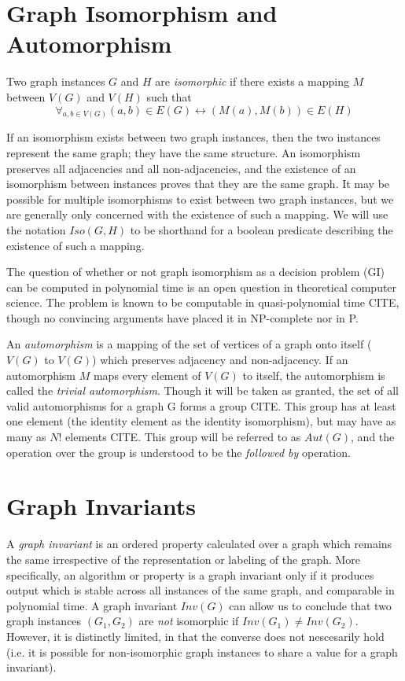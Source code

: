 \section{Graph Isomorphism and Automorphism}

Two graph instances $G$ and $H$ are \emph{isomorphic} if there exists a mapping $M$ between $V(G)$ and $V(H)$ such that $$\forall_{a, b \in V(G)} (a, b) \in E(G) \leftrightarrow (M(a), M(b)) \in E(H)$$

If an isomorphism exists between two graph instances, then the two instances represent the same graph; they have the same structure.
An isomorphism preserves all adjacencies and all non-adjacencies, and the existence of an isomorphism between instances proves that they are the same graph.
It may be possible for multiple isomorphisms to exist between two graph instances, but we are generally only concerned with the existence of such a mapping.
We will use the notation $Iso(G, H)$ to be shorthand for a boolean predicate describing the existence of such a mapping.

The question of whether or not graph isomorphism as a decision problem (GI) can be computed in polynomial time is an open question in theoretical computer science.
The problem is known to be computable in quasi-polynomial time CITE, though no convincing arguments have placed it in NP-complete nor in P.

An \emph{automorphism} is a mapping of the set of vertices of a graph onto itself ($V(G)$ to $V(G)$) which preserves adjacency and non-adjacency.
If an automorphism $M$ maps every element of $V(G)$ to itself, the automorphism is called the \emph{trivial automorphism}.
Though it will be taken as granted, the set of all valid automorphisms for a graph G forms a group CITE.
This group has at least one element (the identity element as the identity isomorphism), but may have as many as $N!$ elements CITE.
This group will be referred to as $Aut(G)$, and the operation over the group is understood to be the \emph{followed by} operation.



\section{Graph Invariants}
A \emph{graph invariant} is an ordered property calculated over a graph which remains the same irrespective of the representation or labeling of the graph.
More specifically, an algorithm or property is a graph invariant only if it produces output which is stable across all instances of the same graph, and comparable in polynomial time.
A graph invariant $Inv(G)$ can allow us to conclude that two graph instances $(G_1, G_2)$ are \emph{not} isomorphic if $Inv(G_1) \neq Inv(G_2)$.
However, it is distinctly limited, in that the converse does not nescesarily hold (i.e. it is possible for non-isomorphic graph instances to share a value for a graph invariant).


